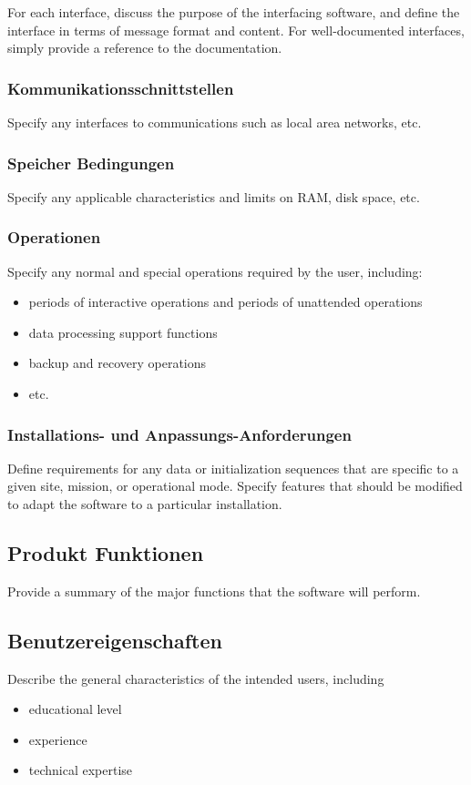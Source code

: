 \noindent For each interface, discuss the purpose of the interfacing software, and define the interface in terms of message format and content. For well-documented interfaces, simply provide a reference to the documentation. \\[-0.3cm]

\subsubsection{Kommunikationsschnittstellen}
Specify any interfaces to communications such as local area networks, etc.

\subsubsection{Speicher Bedingungen}
Specify any applicable characteristics and limits on RAM, disk space, etc.

\subsubsection{Operationen}
Specify any normal and special operations required by the user, including:
\begin{itemize}
	\item periods of interactive operations and periods of unattended operations
	\item data processing support functions
	\item backup and recovery operations
	\item etc.
\end{itemize}

\subsubsection{Installations- und Anpassungs-Anforderungen}
Define requirements for any data or initialization sequences that are specific to a given site, mission, or operational mode. Specify features that should be modified to adapt the software to a particular installation.

\subsection{Produkt Funktionen}
Provide a summary of the major functions that the software will perform.

\subsection{Benutzereigenschaften}
Describe the general characteristics of the intended users, including
\begin{itemize}
	\item educational level
	\item experience
	\item technical expertise
\end{itemize}

